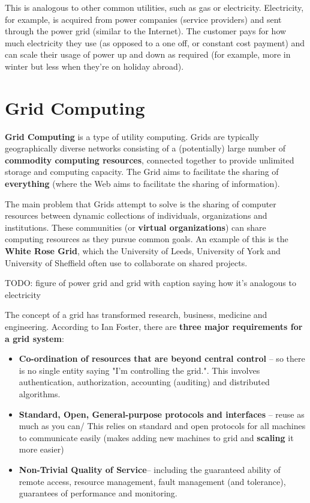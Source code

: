 \documentclass{article}
\begin{document}
This is analogous to other common utilities, such as gas or electricity. Electricity, for example, is acquired from power companies (service providers) and sent through the power grid (similar to the Internet). The customer pays for how much electricity they use (as opposed to a one off, or constant cost payment) and can scale their usage of power up and down as required (for example, more in winter but less when they're on holiday abroad).

\section{Grid Computing}
 
\textbf{Grid Computing} is a type of utility computing. Grids are typically geographically diverse networks consisting of a (potentially) large number of \textbf{commodity computing resources}, connected together to provide unlimited storage and computing capacity. The Grid aims to facilitate the sharing of \textbf{everything} (where the Web aims to facilitate the sharing of information). 

The main problem that Grids attempt to solve is the sharing of computer resources between dynamic collections of individuals, organizations and institutions. These communities (or \textbf{virtual organizations}) can share computing resources as they pursue common goals. An example of this is the \textbf{White Rose Grid}, which the University of Leeds, University of York and University of Sheffield often use to collaborate on shared projects.

TODO: figure of power grid and grid with caption saying how it's analogous to electricity

The concept of a grid has transformed research, business, medicine and engineering. According to Ian Foster, there are \textbf{three major requirements for a grid system}:
\begin{itemize}
    \item \textbf{Co-ordination of resources that are beyond central control} -- so there is no single entity saying "I'm controlling the grid.". This involves authentication, authorization, accounting (auditing) and distributed algorithms.
    \item \textbf{Standard, Open, General-purpose protocols and interfaces} -- reuse as much as you can/ This relies on standard and open protocols for all machines to communicate easily (makes adding new machines to grid and \textbf{scaling} it more easier)
    \item \textbf{Non-Trivial Quality of Service}--  including the guaranteed ability of remote access, resource management, fault management (and tolerance), guarantees of performance and monitoring.
\end{itemize}
\end{document}
